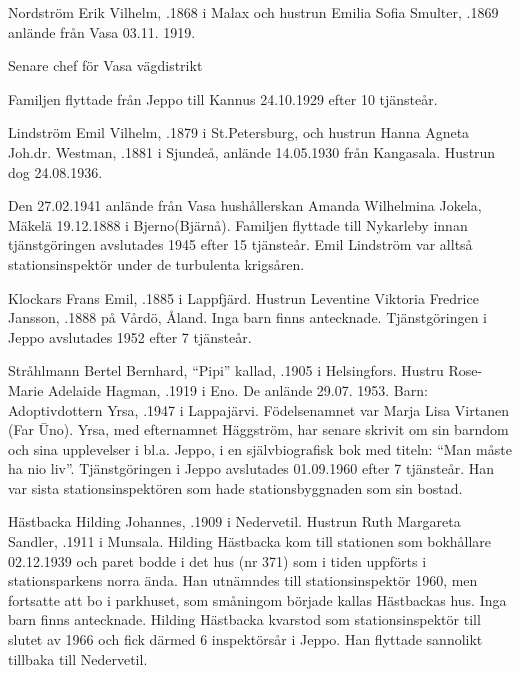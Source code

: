  Nordström Erik Vilhelm, .1868 i Malax och hustrun Emilia Sofia Smulter, .1869 anlände från Vasa 03.11. 1919.
\begin{jhchildren}
  \item {} Senare chef för Vasa vägdistrikt
  \item {}
\end{jhchildren}
Familjen flyttade från Jeppo till Kannus 24.10.1929 efter 10 tjänsteår.

 Lindström Emil Vilhelm, .1879 i St.Petersburg, och hustrun Hanna Agneta Joh.dr. Westman, .1881 i Sjundeå, anlände 14.05.1930 från Kangasala. Hustrun dog 24.08.1936.
\begin{jhchildren}
  \item {}
  \item {}
\end{jhchildren}
Den 27.02.1941 anlände från Vasa hushållerskan Amanda Wilhelmina Jokela, \textborn Mäkelä 19.12.1888 i Bjerno(Bjärnå). Familjen flyttade till Nykarleby innan tjänstgöringen avslutades 1945 efter 15 tjänsteår. Emil Lindström var alltså stationsinspektör under de turbulenta krigsåren.




 Klockars Frans Emil, .1885 i Lappfjärd. Hustrun Leventine Viktoria Fredrice Jansson, .1888 på Vårdö, Åland. Inga barn finns antecknade. Tjänstgöringen  i Jeppo avslutades 1952 efter 7 tjänsteår.

 Stråhlmann Bertel Bernhard, ``Pipi'' kallad, .1905 i Helsingfors. Hustru Rose-Marie Adelaide Hagman, .1919 i Eno. De anlände 29.07. 1953.
Barn: Adoptivdottern Yrsa, .1947 i Lappajärvi. Födelsenamnet var Marja Lisa Virtanen (Far \= Uno). Yrsa, med efternamnet Häggström, har senare skrivit om sin barndom och sina upplevelser i bl.a. Jeppo, i en självbiografisk bok med titeln: ``Man måste ha nio liv''.
Tjänstgöringen i Jeppo avslutades 01.09.1960 efter 7 tjänsteår. Han var sista stationsinspektören som hade stationsbyggnaden som sin bostad.

 Hästbacka Hilding Johannes, .1909 i Nedervetil. Hustrun Ruth Margareta Sandler, .1911 i Munsala. Hilding Hästbacka kom till stationen som bokhållare 02.12.1939 och paret bodde i det hus (nr 371) som i tiden uppförts i stationsparkens norra ända. Han utnämndes till stationsinspektör 1960, men fortsatte att bo i parkhuset, som småningom började kallas Hästbackas hus. Inga barn finns antecknade. Hilding Hästbacka kvarstod som stationsinspektör till slutet av 1966 och fick därmed 6 inspektörsår i Jeppo. Han flyttade sannolikt tillbaka till Nedervetil.

